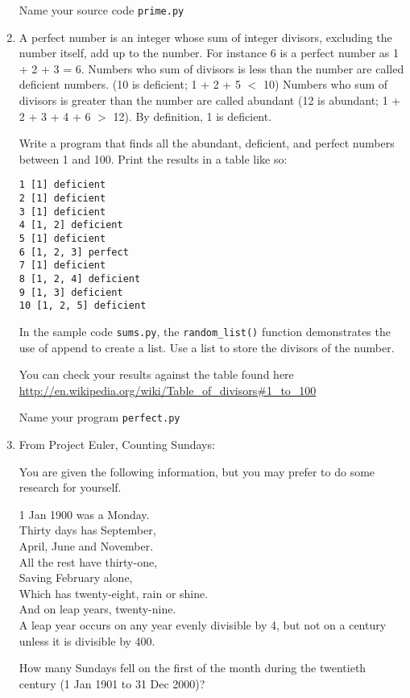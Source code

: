 \documentclass[12pt]{article}
\begin{document}
\begin{enumerate}
Name your source code \texttt{prime.py}

\item A perfect number is an integer whose sum of integer divisors, excluding the number itself, add up to the number. For instance 6 is a perfect number as 1 + 2 + 3 = 6. Numbers who sum of divisors is less than the number are called deficient numbers. (10 is deficient; 1 + 2 + 5 $<$ 10) Numbers who sum of divisors is greater than the number are called abundant (12 is abundant; 1 + 2 + 3 + 4 + 6 $>$ 12). By definition, 1 is deficient.
  
  Write a program that finds all the abundant, deficient, and perfect numbers between 1 and 100. Print the results in a table like so:

\begin{lstlisting}[style=bash]
1 [1] deficient
2 [1] deficient
3 [1] deficient
4 [1, 2] deficient
5 [1] deficient
6 [1, 2, 3] perfect
7 [1] deficient
8 [1, 2, 4] deficient
9 [1, 3] deficient
10 [1, 2, 5] deficient
\end{lstlisting}

In the sample code \texttt{sums.py}, the \texttt{random\_list()} function demonstrates the use of append to create a list. Use a list to store the divisors of the number.

You can check your results against the table found here \url{http://en.wikipedia.org/wiki/Table_of_divisors#1_to_100}

Name your program \texttt{perfect.py}



\item From Project Euler, Counting Sundays:
  
  You are given the following information, but you may prefer to do some research for yourself.

    1 Jan 1900 was a Monday.
    \\Thirty days has September,
    \\April, June and November.
    \\All the rest have thirty-one,
    \\Saving February alone,
    \\Which has twenty-eight, rain or shine.
    \\And on leap years, twenty-nine.
    \\A leap year occurs on any year evenly divisible by 4, but not on a century unless it is divisible by 400.

How many Sundays fell on the first of the month during the twentieth century (1 Jan 1901 to 31 Dec 2000)?


\end{enumerate}
\end{document}
